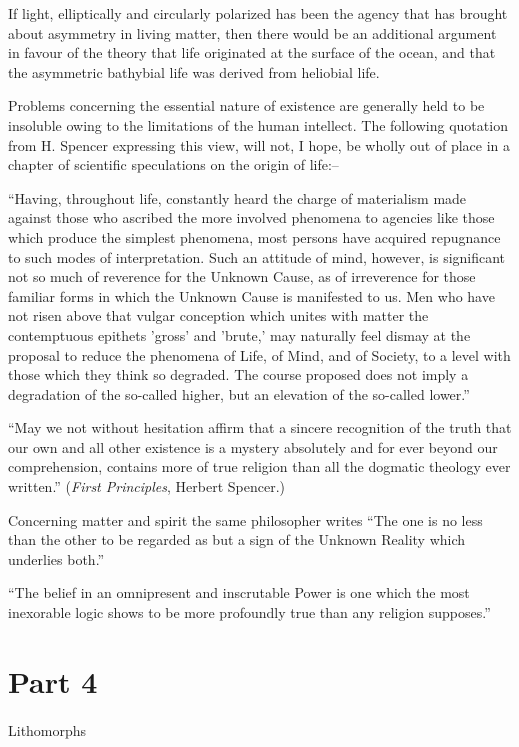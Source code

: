 \documentclass[a4paper, 12pt, oneside]{article}
\begin{document}
If light, elliptically and circularly polarized has been the agency that has brought about asymmetry in living matter, then there would be an additional argument in favour of the theory that life originated at the surface of the ocean, and that the asymmetric bathybial life was derived from heliobial life.

Problems concerning the essential nature of existence are generally held to be insoluble owing to the limitations of the human intellect. The following quotation from H. Spencer expressing this view, will not, I hope, be wholly out of place in a chapter of scientific speculations on the origin of life:--

``Having, throughout life, constantly heard the charge of materialism made against those who ascribed the more involved phenomena to agencies like those which produce the simplest phenomena, most persons have acquired repugnance to such modes of interpretation. Such an attitude of mind, however, is significant not so much of reverence for the Unknown Cause, as of irreverence for those familiar forms in which the Unknown Cause is manifested to us. Men who have not risen above that vulgar conception which unites with matter the contemptuous epithets 'gross' and 'brute,' may naturally feel dismay at the proposal to reduce the phenomena of Life, of Mind, and of Society, to a level with those which they think so degraded. The course proposed does not imply a degradation of the so-called higher, but an elevation of the so-called lower.''

``May we not without hesitation affirm that a sincere recognition of the truth that our own and all other existence is a mystery absolutely and for ever beyond our comprehension, contains more of true religion than all the dogmatic theology ever written.'' (\emph{First Principles}, Herbert Spencer.)

Concerning matter and spirit the same philosopher writes ``The one is no less than the other to be regarded as but a sign of the Unknown Reality which underlies both.''

``The belief in an omnipresent and inscrutable Power is one which the most inexorable logic shows to be more profoundly true than any religion supposes.''
\clearpage
\section{Part 4}
\paragraph{}
Lithomorphs
\end{document}
